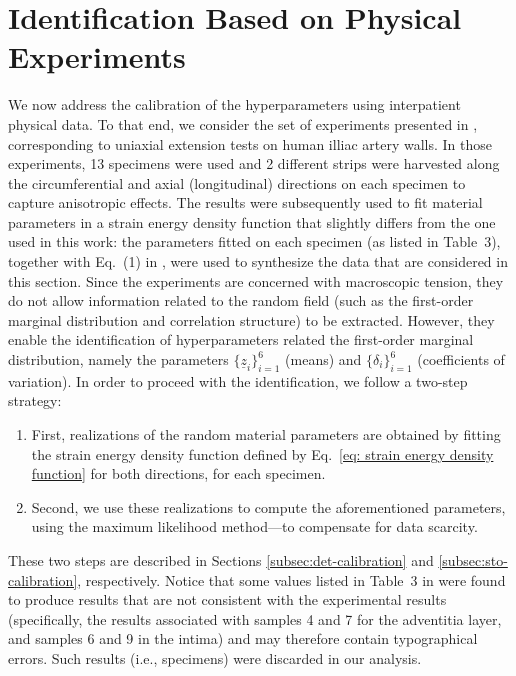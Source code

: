 \section{Identification Based on Physical Experiments} \label{sec:calibration}
We now address the calibration of the hyperparameters using interpatient physical data. To that end, we consider the set of experiments presented in \cite{holzapfel2005determination}, corresponding to uniaxial extension tests on human illiac artery walls. In those experiments, 13 specimens were used and 2 different strips were harvested along the circumferential and axial (longitudinal) directions on each specimen to capture anisotropic effects. The results were subsequently used to fit material parameters in a strain energy density function that slightly differs from the one used in this work: the parameters fitted on each specimen (as listed in Table~3), together with Eq.~(1) in \cite{holzapfel2005determination}, were used to synthesize the data that are considered in this section. Since the experiments are concerned with macroscopic tension, they do not allow information related to the random field (such as the first-order marginal distribution and correlation structure) to be extracted. However, they enable the identification of hyperparameters related the first-order marginal distribution, namely the parameters $\{\underline{z}_i\}_{i = 1}^6$ (means) and $\{\delta_i\}_{i = 1}^6$ (coefficients of variation). In order to proceed with the identification, we follow a two-step strategy:
\begin{enumerate}
    \item First, realizations of the random material parameters are obtained by fitting the strain energy density function defined by Eq.~\eqref{eq: strain energy density function} for both directions, for each specimen.
    \item Second, we use these realizations to compute the aforementioned parameters, using the maximum likelihood method---to compensate for data scarcity.
\end{enumerate}
These two steps are described in Sections \ref{subsec:det-calibration} and \ref{subsec:sto-calibration}, respectively. Notice that some values listed in Table~3 in \cite{holzapfel2005determination} were found to produce results that are not consistent with the experimental results (specifically, the results associated with samples 4 and 7 for the adventitia layer, and samples 6 and 9 in the intima) and may therefore contain typographical errors. Such results (i.e., specimens) were discarded in our analysis.


